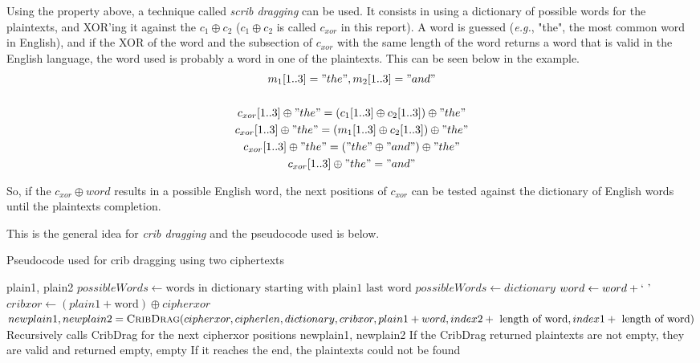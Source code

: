 \documentclass[a4paper,11pt]{article}
\begin{document}
Using the property above, a technique called \textit{scrib dragging} can be used.
It consists in using a dictionary of possible words for the plaintexts, and XOR'ing it
against the $c_1 \oplus c_2$ ($c_1 \oplus c_2$ is called $c_{xor}$ in this report).
A word is guessed (\textit{e.g.}, "the", the most common word in English), and if the
XOR of the word and the subsection of $c_{xor}$ with the same length of the word
returns a word that is valid in the English language, the word used is probably
a word in one of the plaintexts. This can be seen below in the example.
\begin{gather*}
	m_1[1..3] = "the", m_2[1..3] = "and" \\ \\
	c_{xor}[1..3] \oplus "the" = (c_1[1..3] \oplus c_2[1..3]) \oplus "the" \\
	c_{xor}[1..3] \oplus "the" = (m_1[1..3] \oplus c_2[1..3]) \oplus "the" \\
	c_{xor}[1..3] \oplus "the" = ("the" \oplus "and") \oplus "the" \\
	c_{xor}[1..3] \oplus "the" = "and"
\end{gather*}

So, if the $c_{xor} \oplus word$ results in a possible English word, the next positions
of $c_{xor}$ can be tested against the dictionary of English words until the plaintexts
completion.

This is the general idea for \textit{crib dragging} and the pseudocode used is below.

\pagebreak

\begin{algorithm}
\caption{Pseudocode used for crib dragging using two ciphertexts}\label{cribdrag}
\begin{algorithmic}[1]
	\Return plain1, plain2
\EndIf
{}
	\State $possibleWords \gets \text{words in dictionary starting with plain1 last word}$
\Else
	\State $possibleWords \gets dictionary$
\EndIf
{}
	\State $word \gets word + \text{\lq}\text{ }\text{\rq}$
	\State $cribxor \gets (plain1 + \text{word}) \oplus cipherxor$
		\State $newplain1, newplain2 = \Call{CribDrag}{cipherxor, cipherlen, dictionary,
			cribxor, plain1 + word, index2 + \text{ length of word}, index1 + \text{ length of word}}$
		\Comment Recursively calls CribDrag for the next cipherxor positions
			\State \Return newplain1, newplain2
			\Comment If the CribDrag returned plaintexts are not empty, they are valid and returned
		\EndIf
	\EndIf
\EndFor
\State \Return empty, empty
\Comment If it reaches the end, the plaintexts could not be found
\EndProcedure
\end{algorithmic}
\end{algorithm}
\end{document}
